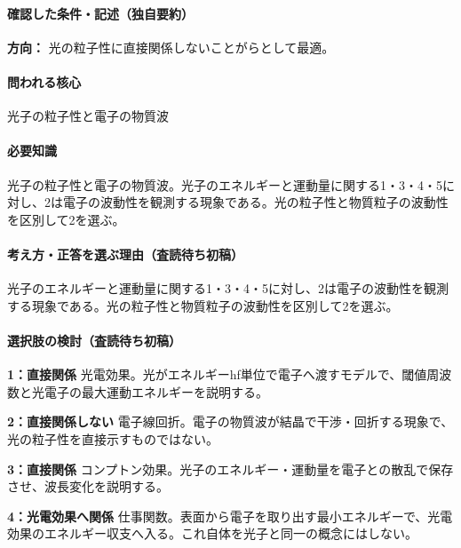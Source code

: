\paragraph{確認した条件・記述（独自要約）}\mbox{}\par

\noindent\textbf{方向：} 光の粒子性に直接関係しないことがらとして最適。\par

\paragraph{問われる核心} 光子の粒子性と電子の物質波

\paragraph{必要知識} 光子の粒子性と電子の物質波。光子のエネルギーと運動量に関する1・3・4・5に対し、2は電子の波動性を観測する現象である。光の粒子性と物質粒子の波動性を区別して2を選ぶ。

\paragraph{考え方・正答を選ぶ理由（査読待ち初稿）} 光子のエネルギーと運動量に関する1・3・4・5に対し、2は電子の波動性を観測する現象である。光の粒子性と物質粒子の波動性を区別して2を選ぶ。

\paragraph{選択肢の検討（査読待ち初稿）}\mbox{}\par

\noindent\textbf{1：直接関係} 光電効果。光がエネルギーhf単位で電子へ渡すモデルで、閾値周波数と光電子の最大運動エネルギーを説明する。\par

\noindent\textbf{2：直接関係しない} 電子線回折。電子の物質波が結晶で干渉・回折する現象で、光の粒子性を直接示すものではない。\par

\noindent\textbf{3：直接関係} コンプトン効果。光子のエネルギー・運動量を電子との散乱で保存させ、波長変化を説明する。\par

\noindent\textbf{4：光電効果へ関係} 仕事関数。表面から電子を取り出す最小エネルギーで、光電効果のエネルギー収支へ入る。これ自体を光子と同一の概念にはしない。\par


